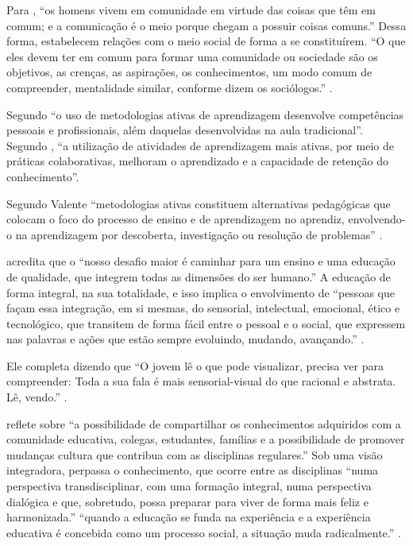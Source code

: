 Para , ``os homens vivem em comunidade em virtude das coisas que têm em comum; e a comunicação é o meio porque chegam a possuir coisas comuns.'' Dessa forma, estabelecem relações com o meio social de forma a se constituírem. ``O que eles devem ter em comum para formar uma comunidade ou sociedade são os objetivos, as crenças, as aspirações, os conhecimentos, um modo comum de compreender, mentalidade similar, conforme dizem os sociólogos.'' \cite[p. 17]{DEWEY1979}.

Segundo  ``o uso de metodologias ativas de aprendizagem desenvolve competências pessoais e profissionais, além daquelas desenvolvidas na aula tradicional''. Segundo  , ``a utilização de atividades de aprendizagem mais ativas, por meio de práticas colaborativas, melhoram o aprendizado e a capacidade de retenção do conhecimento''.

Segundo Valente ``metodologias ativas constituem alternativas pedagógicas que colocam o foco do processo de ensino e de aprendizagem no aprendiz, envolvendo-o na aprendizagem por descoberta, investigação ou resolução de problemas'' \cite[p. 27]{VALENTE2018}.

 acredita que o ``nosso desafio maior é caminhar para um ensino e uma educação de qualidade, que integrem todas as dimensões do ser humano.'' A educação de forma integral, na sua totalidade, e isso implica o envolvimento de ``pessoas que façam essa integração, em si mesmas, do sensorial, intelectual, emocional, ético e tecnológico, que transitem de forma fácil entre o pessoal e o social, que expressem nas palavras e ações que estão sempre evoluindo, mudando, avançando.'' \cite[p. 29]{MORAN2012}.

Ele completa dizendo que ``O jovem lê o que pode visualizar, precisa ver para compreender: Toda a sua fala é mais sensorial-visual do que racional e abstrata. Lê, vendo.'' \cite[p. 29]{MORAN1995}.

 reflete sobre ``a possibilidade de compartilhar os conhecimentos adquiridos com a comunidade educativa, colegas, estudantes, famílias e a possibilidade de promover mudanças cultura que contribua com as disciplinas regulares.'' Sob uma visão integradora, perpassa o conhecimento, que ocorre entre as disciplinas ``numa perspectiva transdisciplinar, com uma formação integral, numa perspectiva dialógica e que, sobretudo, possa preparar para viver de forma mais feliz e harmonizada.'' ``quando a educação se funda na experiência e a experiência educativa é concebida como um processo social, a situação muda radicalmente.'' \cite[p. 55]{DEWEY1979}.

